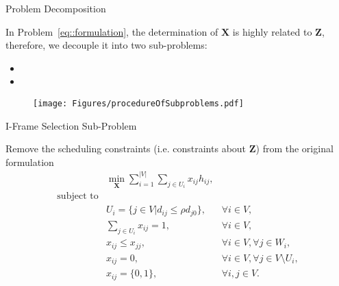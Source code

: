 \begin{frame}{Problem Decomposition}
\begin{itemize}
	\myItem In Problem~\eqref{eq::formulation}, the determination of $\mathbf{X}$ is highly related to $\mathbf{Z}$, therefore, we decouple it into two sub-problems:
	\begin{itemize}
		\mySubItem I-frame selection sub-problem $\xLongrightarrow{\text{solve   }}$ $\mathbf{X}$
		\mySubItem P-frame association sub-problem $\xLongrightarrow{\text{solve   }}$ $\mathbf{Z}$
		\item[]
		\item[]
	\end{itemize}
	\begin{figure}
		\centering
		\texttt{[image: Figures/procedureOfSubproblems.pdf]}
	\end{figure}
\end{itemize}
\end{frame}
\begin{frame}{I-Frame Selection Sub-Problem}
\begin{itemize}
	\myItem Remove the scheduling constraints (i.e. constraints about $\mathbf{Z}$) from the original formulation
	{\small \begin{align}
		&\underset{\mathbf{X}}{\min} \sum_{i=1}^{|V|} \sum_{j \in U_i}  x_{ij} h_{ij}, & \nonumber \\
		\text{subject to} & & \nonumber \\
		&U_i = \{ j \in V | d_{ij} \leq \rho d_{j0} \}, &\forall i \in V, \nonumber \\
		&\sum_{j \in U_i} x_{ij} = 1, &\forall i \in V, \nonumber \\
		&x_{ij} \leq x_{jj}, &\forall i \in V, \forall j \in W_i, \nonumber \\
		&x_{ij} = 0, &\forall i \in V, \forall j \in V \setminus U_i, \nonumber \\
		&x_{ij} = \{0,1\}, &\forall i,j \in V.
		\label{eq::formulationSimplified}
	\end{align} }%
\end{itemize}
\end{frame}
